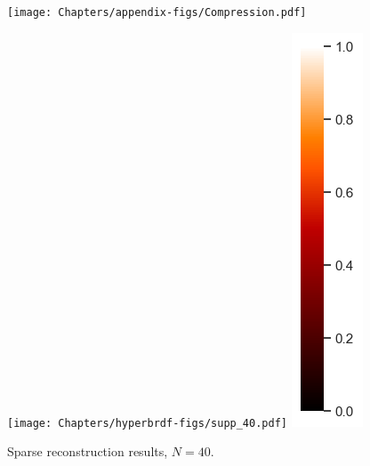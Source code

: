 \newpage
 \begin{figure}[ht]
   \centering
  {\texttt{[image: Chapters/appendix-figs/Compression.pdf]}}
  \caption{}
    \label{fig:full-comp}
 \end{figure}

    {%





\begin{figure}
  \centering

  {\texttt{[image: Chapters/hyperbrdf-figs/supp\_40.pdf]}}
  {\includegraphics[width=0.02\linewidth]{Chapters/hyperbrdf-figs/vbar.png}}
   \caption{Sparse reconstruction results, $N = 40$.}
   \label{fig:40}
\end{figure}

}
